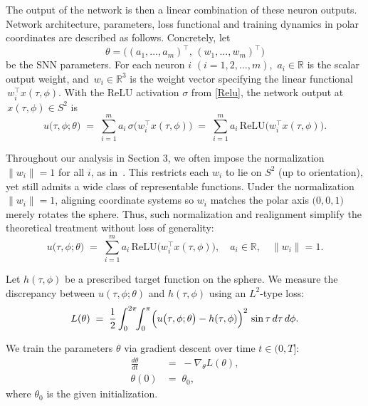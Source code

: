 \documentclass[review,onefignum,onetabnum,onealgnum]{siamart250106}
\numberwithin{theorem}{section}
\begin{document}
The output of the network is then a linear combination of these neuron outputs. Network architecture, parameters, loss functional and training dynamics in polar coordinates are described as follows. Concretely, let
$$\theta = \bigl((a_1,\dots,a_m)^\top,\,(w_1,\dots,w_m)^\top\bigr)$$
be the SNN parameters.  For each neuron \(i\) $(i = 1,2,\ldots,m)$, \(\,a_i \in \mathbb{R}\) is the scalar output weight, and
\(\,w_i\in\mathbb{R}^3\) is the weight vector specifying the linear functional
\(\,w_i^\top x(\tau,\phi)\).  
With the ReLU activation \(\sigma\) from \eqref{Relu}, the network output at \(\,x(\tau,\phi)\in S^2\) is
\begin{equation}\label{neuralnetwork-sphere}
u\bigl(\tau,\phi;\theta\bigr)
\;=\;
\sum_{i=1}^m 
a_i\,\sigma\bigl(w_i^\top x(\tau,\phi)\bigr)
\;=\;
\sum_{i=1}^m 
a_i\,\mathrm{ReLU}\bigl(w_i^\top x(\tau,\phi)\bigr).
\end{equation}


\begin{remark}
Throughout our analysis in Section 3, we often impose the normalization \(\|w_i\|=1\) for all \(i\), as in~\cite[Proposition~2.1]{AS:2021}.  This restricts each \(w_i\) to lie on \(S^2\) (up to orientation), yet still admits a wide class of representable functions. Under the normalization \(\|w_i\|=1\), aligning coordinate systems so \(w_i\) matches the polar axis \(\bigl(0,0,1\bigr)\) merely rotates the sphere.  Thus, such normalization and realignment simplify the theoretical treatment without loss of generality:
\begin{equation}\label{nnrepresent-sphere}
u\bigl(\tau,\phi;\theta\bigr)
\;=\;
\sum_{i=1}^m 
a_i \,\mathrm{ReLU}\bigl(w_i^\top x(\tau,\phi)\bigr),
\quad 
a_i\in\mathbb{R},\quad \|w_i\|=1.
\end{equation}
\end{remark}

Let \(h(\tau,\phi)\) be a prescribed target function on the sphere.  We measure the discrepancy between \(u(\tau,\phi;\theta)\) and \(h(\tau,\phi)\) using an \(L^2\)-type loss:
\begin{equation}\label{l2spheredomain}
L(\theta)
\;=\;
\frac12
\int_{0}^{2\pi}\!\!\int_{0}^{\pi}
\Bigl(u\bigl(\tau,\phi;\theta\bigr)-h(\tau,\phi)\Bigr)^2
\,\sin\tau\,d\tau\,d\phi.
\end{equation}

We train the parameters \(\theta\) via gradient descent over time \(t\in(0,T]\):
\begin{equation}\label{trainingode-sphere}
\begin{aligned}
\frac{d\theta}{dt} 
&=\;
-\nabla_{\theta}L(\theta),\\
\theta(0)
&=\;\theta_0,
\end{aligned}
\end{equation}
where \(\theta_0\) is the given initialization.
\end{document}
